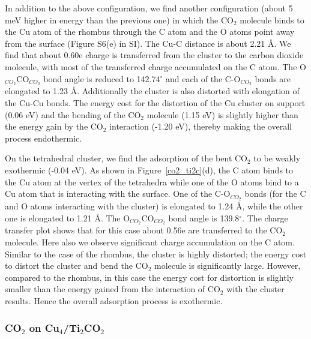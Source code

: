 In addition to the above configuration, we find another configuration (about 5 meV higher in energy than
the previous one) in which the CO$_2$ molecule binds to the Cu atom of the rhombus through the C atom and the O atoms point away from the surface (Figure S6(e) in SI). The Cu-C distance is about 2.21 \AA. We find that about 0.60e charge is transferred from the cluster to the carbon dioxide molecule, with most of the transferred charge accumulated on the C atom. The O$_{CO_2}$CO$_{CO_2}$ bond angle is reduced to 142.74$^{\circ}$ and each of the C-O$_{CO_2}$ 
bonds are elongated to 1.23 \AA. Additionally the cluster is also distorted with elongation of the Cu-Cu bonds. The energy cost for the distortion of the Cu cluster on support (0.06 eV) and the bending of the CO$_2$ molecule (1.15 eV) is slightly higher than the energy gain by the CO$_2$ interaction (-1.20 eV), thereby making the overall process endothermic.

On the tetrahedral cluster, we find the adsorption of the bent CO$_2$ to be weakly exothermic (-0.04 eV). As shown in Figure~\ref{co2_ti2c}(d), the C atom binds to the Cu atom at the vertex of the tetrahedra while one of the O atoms bind to a Cu atom that is interacting with the surface. One of the C-O$_{CO_2}$ bonds (for the C and O atoms interacting with the cluster) is elongated to 1.24 \AA, while the other one is elongated to 1.21 \AA. The O$_{CO_2}$CO$_{CO_2}$ bond angle is 139.8$^{\circ}$. The charge transfer plot shows that for this case about 0.56e are transferred to the CO$_2$ molecule. Here also we observe significant charge accumulation on the C atom. Similar to the case of the rhombus, the cluster is highly distorted; the energy cost to distort the cluster and bend the CO$_2$ molecule is significantly large. However, compared to the rhombus, in this case the energy cost for distortion is slightly smaller than the energy gained from the interaction of CO$_2$ with the cluster results. Hence the overall adsorption process is exothermic.

\subsubsection{CO\texorpdfstring{$_2$}{} on Cu\texorpdfstring{$_4$}{}/Ti\texorpdfstring{$_2$}{}CO\texorpdfstring{$_2$}{}}
\label{fooking}

